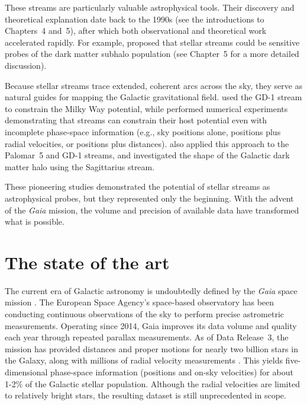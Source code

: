     These streams are particularly valuable astrophysical tools. Their discovery and theoretical explanation date back to the 1990s (see the introductions to Chapters~4 and~5), after which both observational and theoretical work accelerated rapidly. For example, \citet{2002MNRAS.332..915I} proposed that stellar streams could be sensitive probes of the dark matter subhalo population (see Chapter~5 for a more detailed discussion).

    Because stellar streams trace extended, coherent arcs across the sky, they serve as natural guides for mapping the Galactic gravitational field. \citet{2010ApJ...712..260K} used the GD-1 stream to constrain the Milky Way potential, while \citet{2011MNRAS.417..198V} performed numerical experiments demonstrating that streams can constrain their host potential even with incomplete phase-space information (e.g., sky positions alone, positions plus radial velocities, or positions plus distances). \citet{2016ApJ...833...31B} also applied this approach to the Palomar~5 and GD-1 streams, and \citet{2010ApJ...718.1128L} investigated the shape of the Galactic dark matter halo using the Sagittarius stream.

    These pioneering studies demonstrated the potential of stellar streams as astrophysical probes, but they represented only the beginning. With the advent of the \emph{Gaia} mission, the volume and precision of available data have transformed what is possible.

\section{The state of the art}
    The current era of Galactic astronomy is undoubtedly defined by the \emph{Gaia} space mission \citep{2016A&A...595A...1G,2016A&A...595A...2G,2018A&A...616A...1G,2021A&A...650C...3G,2023A&A...674A...1G}. The European Space Agency's space-based observatory has been conducting continuous observations of the sky to perform precise astrometric measurements. Operating since 2014, Gaia improves its data volume and quality each year through repeated parallax measurements.  As of Data Release~3, the mission has provided distances and proper motions for nearly two billion stars in the Galaxy, along with millions of radial velocity measurements \citep{2023A&A...674A...1G}. This yields five-dimensional phase-space information (positions and on-sky velocities) for about 1-2\% of the Galactic stellar population. Although the radial velocities are limited to relatively bright stars, the resulting dataset is still unprecedented in scope.

